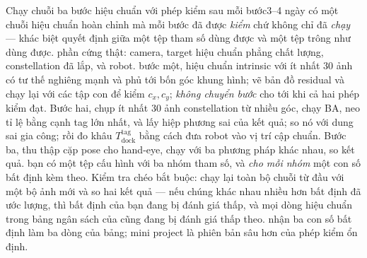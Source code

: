 \documentclass[../../marker.tex]{subfiles}
\begin{document}
\begin{ungdung}
\end{ungdung}

\begin{duan}{Chạy chuỗi ba bước hiệu chuẩn với phép kiểm sau mỗi bước}{3--4 ngày}
\dmt có một chuỗi hiệu chuẩn hoàn chỉnh mà mỗi bước đã được \emph{kiểm} chứ không chỉ đã \emph{chạy} --- khác biệt quyết định giữa một tệp tham số dùng được và một tệp trông như dùng được.
\ddl phần cứng thật: camera, target hiệu chuẩn phẳng chất lượng, constellation đã lắp, và robot.
\dbc bước một, hiệu chuẩn intrinsic với ít nhất 30 ảnh có tư thế nghiêng mạnh và phủ tới bốn góc khung hình; vẽ bản đồ residual và chạy lại với các tập con để kiểm \(c_x, c_y\); \emph{không chuyển bước} cho tới khi cả hai phép kiểm đạt. Bước hai, chụp ít nhất 30 ảnh constellation từ nhiều góc, chạy BA, neo tỉ lệ bằng cạnh tag lớn nhất, và lấy hiệp phương sai của kết quả; so nó với dung sai gia công; rồi đo khâu \(T^{\text{tag}}_{\text{dock}}\) bằng cách đưa robot vào vị trí cập chuẩn. Bước ba, thu thập cặp pose cho hand-eye, chạy với ba phương pháp khác nhau, so kết quả.
\dxk bạn có một tệp cấu hình với ba nhóm tham số, và \emph{cho mỗi nhóm} một con số bất định kèm theo. Kiểm tra chéo bắt buộc: chạy lại toàn bộ chuỗi từ đầu với một bộ ảnh mới và so hai kết quả --- nếu chúng khác nhau nhiều hơn bất định đã ước lượng, thì bất định của bạn đang bị đánh giá thấp, và mọi dòng hiệu chuẩn trong bảng ngân sách của  cũng đang bị đánh giá thấp theo.
\dnv {} nhận ba con số bất định làm ba dòng của bảng;  mini project là phiên bản sâu hơn của phép kiểm ổn định.
\end{duan}
\end{document}
